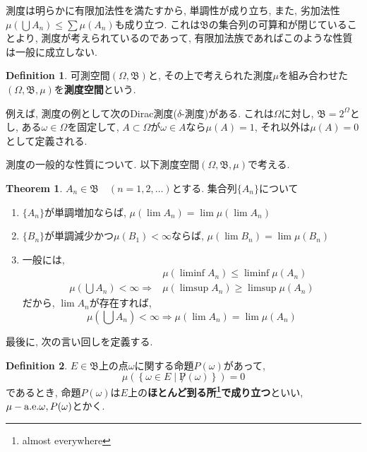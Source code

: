 \documentclass[a4j,dvipdfmx]{jsarticle}
\newcommand{\B}{\mathfrak{B}}
\theoremstyle{definition}
\newtheorem{definition}{Definition}[section]
\theoremstyle{definition}
\newtheorem{theorem}{Theorem}[section]
\numberwithin{equation}{section}
\begin{document}
            測度は明らかに有限加法性を満たすから, 単調性が成り立ち, また, 劣加法性$\mu(\bigcup A_n)\leq \sum \mu(A_n)$も成り立つ. これは$\B$の集合列の可算和が閉じていることより, 
            測度が考えられているのであって, 有限加法族であればこのような性質は一般に成立しない.

            \begin{definition}
                可測空間$(\Omega,\B)$と, その上で考えられた測度$\mu$を組み合わせた$(\Omega,\B,\mu)$を\textbf{測度空間}という.
            \end{definition}
            \clearpage

            例えば, 測度の例として次のDirac測度($\delta$-測度)がある. これは$\Omega$に対し, $\B=2^\Omega$とし, ある$\omega\in\Omega$を固定して, 
            $A\subset \Omega$が$\omega \in A$なら$\mu(A)=1$, それ以外は$\mu(A)=0$として定義される.

            測度の一般的な性質について. 以下測度空間$(\Omega,\B,\mu)$で考える.

            \begin{theorem}
                $A_n\in \B\quad (n=1,2,\dots)$とする. 集合列$\{A_n\}$について
                \begin{enumerate}\renewcommand{\labelenumi}{(\arabic{enumi})}
                    \item $\{A_n\}$が単調増加ならば, $\mu(\lim A_n)=\lim \mu (\lim A_n)$
                    \item $\{B_n\}$が単調減少かつ$\mu(B_1)<\infty$ならば, $\mu(\lim B_n) = \lim \mu(B_n)$
                    \item 一般には, 
                    \begin{align}
                        &\mu(\liminf A_n) \leq \liminf\mu(A_n) \\ 
                        \mu\left(\bigcup A_n\right)<\infty \Rightarrow &\mu(\limsup A_n) \geq \limsup\mu(A_n)
                    \end{align}
                    だから, $\lim A_n$が存在すれば, 
                    \begin{equation}
                        \mu\left(\bigcup A_n\right)<\infty \Rightarrow \mu(\lim A_n) = \lim\mu(A_n)
                    \end{equation}
                \end{enumerate}
            \end{theorem}

            最後に, 次の言い回しを定義する.
            \begin{definition}
                $E\in\B$上の点$\omega$に関する命題$P(\omega)$があって, 
                \begin{equation}
                    \mu(\left\{\omega\in E\mid \not P(\omega)\right\})=0
                \end{equation}
                であるとき, 命題$P(\omega)$は$E$上の\textbf{ほとんど到る所\footnote{almost everywhere}で成り立つ}といい, $\mu-{\rm a.e}.\omega, P(\omega)$とかく.
            \end{definition}
        \clearpage
\end{document}
